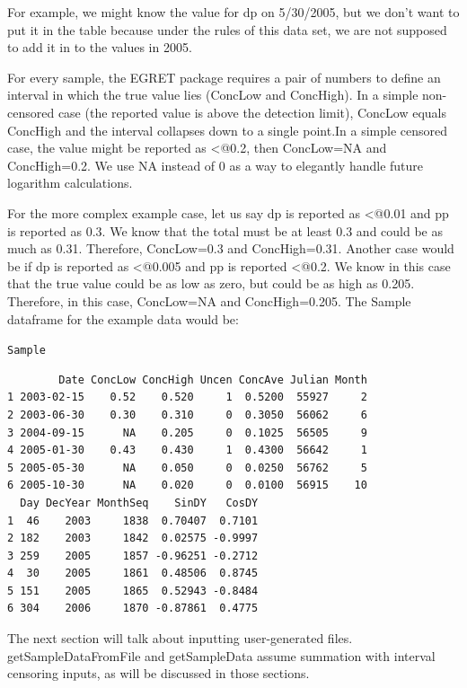 \documentclass[a4paper,11pt]{article}\usepackage[]{graphicx}\usepackage[]{color}
\makeatletter
\newcommand{\hlstd}[1]{\textcolor[rgb]{0.345,0.345,0.345}{#1}}%
\newenvironment{kframe}{%
 \def\at@end@of@kframe{}%
 \ifinner\ifhmode%
  \def\at@end@of@kframe{\end{minipage}}%
  \begin{minipage}{\columnwidth}%
 \fi\fi%
 \def\FrameCommand##1{\hskip\@totalleftmargin \hskip-\fboxsep
 \colorbox{shadecolor}{##1}\hskip-\fboxsep
     \hskip-\linewidth \hskip-\@totalleftmargin \hskip\columnwidth}%
 \MakeFramed {\advance\hsize-\width
   \@totalleftmargin\z@ \linewidth\hsize
   \@setminipage}}%
 {\par\unskip\endMakeFramed%
 \at@end@of@kframe}
\newenvironment{knitrout}{}{} %
\makeatother
\begin{document}
For example, we might know the value for dp on 5/30/2005, but we don't want to put it in the table because under the rules of this data set, we are not supposed to add it in to the values in 2005.

For every sample, the EGRET package requires a pair of numbers to define an interval in which the true value lies (ConcLow and ConcHigh). In a simple non-censored case (the reported value is above the detection limit), ConcLow equals ConcHigh and the interval collapses down to a single point.In a simple censored case, the value might be reported as \verb@<@0.2, then ConcLow=NA and ConcHigh=0.2. We use NA instead of 0 as a way to elegantly handle future logarithm calculations.

For the more complex example case, let us say dp is reported as \verb@<@0.01 and pp is reported as 0.3. We know that the total must be at least 0.3 and could be as much as 0.31. Therefore, ConcLow=0.3 and ConcHigh=0.31. Another case would be if dp is reported as \verb@<@0.005 and pp is reported \verb@<@0.2. We know in this case that the true value could be as low as zero, but could be as high as 0.205. Therefore, in this case, ConcLow=NA and ConcHigh=0.205. The Sample dataframe for the example data would be:




\begin{knitrout}
\color{fgcolor}\begin{kframe}
\begin{alltt}
  \hlstd{Sample}
\end{alltt}
\begin{verbatim}
        Date ConcLow ConcHigh Uncen ConcAve Julian Month
1 2003-02-15    0.52    0.520     1  0.5200  55927     2
2 2003-06-30    0.30    0.310     0  0.3050  56062     6
3 2004-09-15      NA    0.205     0  0.1025  56505     9
4 2005-01-30    0.43    0.430     1  0.4300  56642     1
5 2005-05-30      NA    0.050     0  0.0250  56762     5
6 2005-10-30      NA    0.020     0  0.0100  56915    10
  Day DecYear MonthSeq    SinDY   CosDY
1  46    2003     1838  0.70407  0.7101
2 182    2003     1842  0.02575 -0.9997
3 259    2005     1857 -0.96251 -0.2712
4  30    2005     1861  0.48506  0.8745
5 151    2005     1865  0.52943 -0.8484
6 304    2006     1870 -0.87861  0.4775
\end{verbatim}
\end{kframe}
\end{knitrout}


The next section will talk about inputting user-generated files. getSampleDataFromFile and getSampleData assume summation with interval censoring inputs, as will be discussed in those sections.
\end{document}
